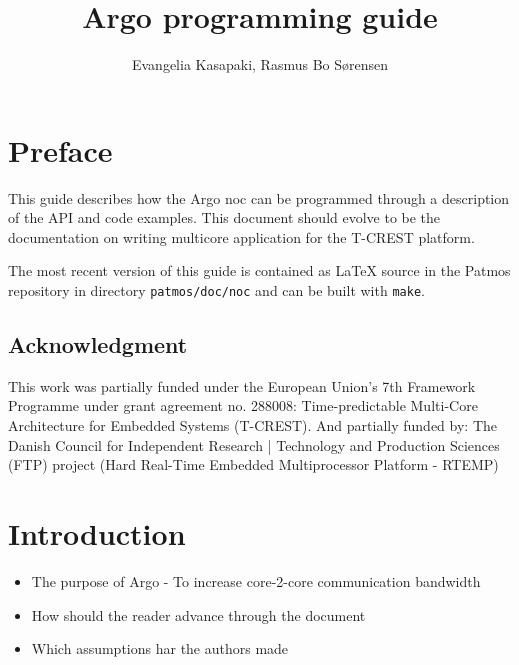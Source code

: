 \documentclass[a4paper,fontsize=10pt,twoside,DIV15,BCOR12mm,headinclude=true,footinclude=false,pagesize,bibtotoc]{scrbook}
\newcommand{\code}[1]{{\texttt{#1}}}
\newcommand{\todo}[1]{{\emph{TODO: #1}}}
\begin{document}
\title{Argo programming guide}

\author{Evangelia Kasapaki,  Rasmus Bo S{\o}rensen}

\lowertitleback{\todo{Copyright and license terms come here.}}

\frontmatter

\maketitle

\chapter{Preface}

This guide describes how the Argo noc can be programmed through a description of the API and code examples.
This document should evolve to be the documentation on writing multicore application for the T-CREST platform.

The most recent version of this guide is contained as LaTeX source in the Patmos repository in directory
\code{patmos/doc/noc} and can be built with \code{make}.

\section*{Acknowledgment}
This work was partially funded under the
European Union's 7th Framework Programme
under grant agreement no. 288008:
Time-predictable Multi-Core Architecture for Embedded
Systems (T-CREST).
And partially funded by:
The Danish Council for Independent Research | Technology and Production Sciences (FTP) 
project (Hard Real-Time Embedded Multiprocessor Platform - RTEMP)

\tableofcontents

\begingroup
\let\cleardoublepage\clearpage
\listoffigures
\listoftables
\endgroup

\mainmatter

\chapter{Introduction}

\begin{itemize}
\item The purpose of Argo - To increase core-2-core communication bandwidth
\item How should the reader advance through the document
\item Which assumptions har the authors made
\end{itemize}
\end{document}

